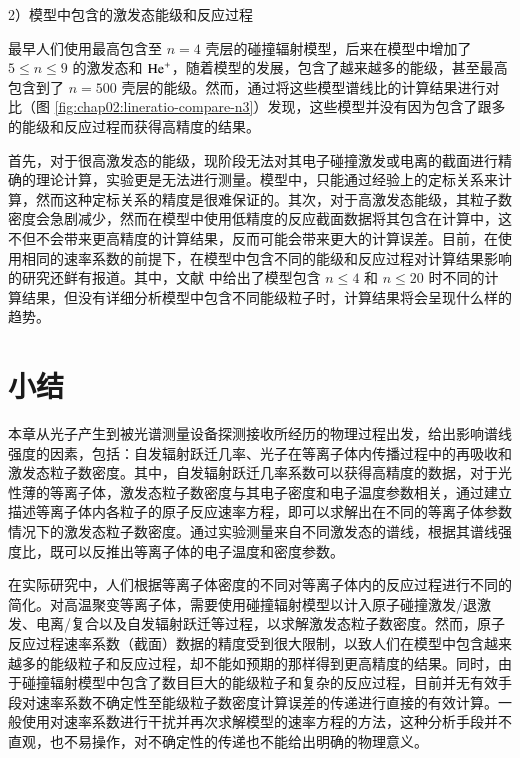 2）模型中包含的激发态能级和反应过程

最早人们使用最高包含至 $n=4$ 壳层的碰撞辐射模型\cite{Brosda1993:Thesis,Schweer1992174}，后来在模型中增加了 $5\le n\le9$ 的激发态和 ${\rm He}^+$\cite{Schmitz2008}，随着模型的发展，包含了越来越多的能级\cite{Ahn2007-He-BES}，甚至最高包含到了 $n=500$ 壳层的能级\cite{burgos2012:PoP}。然而，通过将这些模型谱线比的计算结果进行对比（图 \ref{fig:chap02:lineratio-compare-n3}）发现，这些模型并没有因为包含了跟多的能级和反应过程而获得高精度的结果。

首先，对于很高激发态的能级，现阶段无法对其电子碰撞激发或电离的截面进行精确的理论计算，实验更是无法进行测量。模型中，只能通过经验上的定标关系来计算，然而这种定标关系的精度是很难保证的。其次，对于高激发态能级，其粒子数密度会急剧减少\cite{Fujimoto1979-HeCR,Griem1964-book}，然而在模型中使用低精度的反应截面数据将其包含在计算中，这不但不会带来更高精度的计算结果，反而可能会带来更大的计算误差。目前，在使用相同的速率系数的前提下，在模型中包含不同的能级和反应过程对计算结果影响的研究还鲜有报道。其中，文献   中给出了模型包含 $n\le4$ 和 $n\le20$ 时不同的计算结果，但没有详细分析模型中包含不同能级粒子时，计算结果将会呈现什么样的趋势。


\section{小结}

本章从光子产生到被光谱测量设备探测接收所经历的物理过程出发，给出影响谱线强度的因素，包括：自发辐射跃迁几率、光子在等离子体内传播过程中的再吸收和激发态粒子数密度。其中，自发辐射跃迁几率系数可以获得高精度的数据，对于光性薄的等离子体，激发态粒子数密度与其电子密度和电子温度参数相关，通过建立描述等离子体内各粒子的原子反应速率方程，即可以求解出在不同的等离子体参数情况下的激发态粒子数密度。通过实验测量来自不同激发态的谱线，根据其谱线强度比，既可以反推出等离子体的电子温度和密度参数。

在实际研究中，人们根据等离子体密度的不同对等离子体内的反应过程进行不同的简化。对高温聚变等离子体，需要使用碰撞辐射模型以计入原子碰撞激发/退激发、电离/复合以及自发辐射跃迁等过程，以求解激发态粒子数密度。然而，原子反应过程速率系数（截面）数据的精度受到很大限制，以致人们在模型中包含越来越多的能级粒子和反应过程，却不能如预期的那样得到更高精度的结果。同时，由于碰撞辐射模型中包含了数目巨大的能级粒子和复杂的反应过程，目前并无有效手段对速率系数不确定性至能级粒子数密度计算误差的传递进行直接的有效计算。一般使用对速率系数进行干扰并再次求解模型的速率方程的方法，这种分析手段并不直观，也不易操作，对不确定性的传递也不能给出明确的物理意义。

